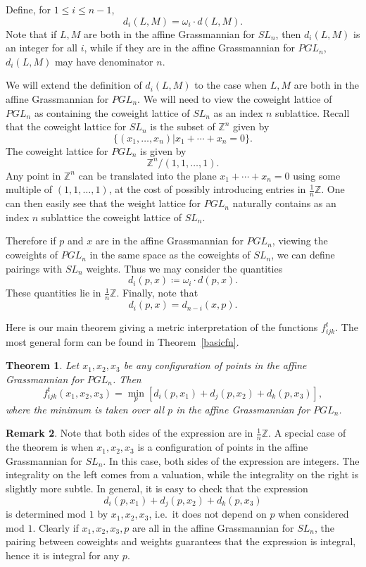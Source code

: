 \documentclass[10pt]{amsart}
\newtheorem{theorem}{Theorem}[section]
\theoremstyle{definition}
\newtheorem{rema}[theorem]{Remark}
\newcommand{\ie}{i.e.\ }
\newcommand{\Z}{\mathbb{Z}}
\begin{document}
Define, for $1 \leq i \leq n-1$,
\[
d_i(L,M) = \omega_i \cdot d(L,M).
\]
Note that if $L, M$ are both in the affine Grassmannian for $SL_n$, then $d_i(L,M)$ is an integer for all $i$, while if they are in the affine Grassmannian for $PGL_n$, $d_i(L,M)$ may have denominator $n$.

We will extend the definition of $d_i(L,M)$ to the case when $L, M$ are both in the affine Grassmannian for $PGL_n$. We will need to view the coweight lattice of $PGL_n$ as containing the coweight lattice of $SL_n$ as an index $n$ sublattice. Recall that the coweight lattice for $SL_n$ is the subset of $\Z^n$ given by 
\[
\{(x_1, \dots, x_n) | x_1 + \cdots + x_n=0\}.
\]
The coweight lattice for $PGL_n$ is given by
\[
\Z^n/(1, 1, \dots, 1).
\]
Any point in $\Z^n$ can be translated into the plane $x_1 + \cdots + x_n=0$ using some multiple of $(1, 1, \dots, 1)$, at the cost of possibly introducing entries in $\frac{1}{n} \Z.$ One can then easily see that the weight lattice for $PGL_n$ naturally contains as an index $n$ sublattice the coweight lattice of $SL_n$.

Therefore if $p$ and $x$ are in the affine Grassmannian for $PGL_n$, viewing the coweights of $PGL_n$ in the same space as the coweights of $SL_n$, we can define pairings with $SL_n$ weights. Thus we may consider the quantities 
\[
d_i(p,x) \coloneqq  \omega_i \cdot d(p,x).
\]
These quantities lie in $\frac{1}{n} \Z$. Finally, note that
\[
d_i(p,x) = d_{n-i}(x,p).
\]


Here is our main theorem giving a metric interpretation of the functions $f_{ijk}^t.$ The most general form can be found in Theorem~\ref{basicfn}.

\begin{theorem}\label{geometric} Let $x_1, x_2, x_3$ be any configuration of points in the affine Grassmannian for $PGL_n$. Then 
\begin{equation}\label{geoeqn}
f_{ijk}^t (x_1,x_2,x_3) = \min_{p} [d_i(p,x_1) + d_j(p,x_2) + d_k(p,x_3)],
\end{equation}
where the minimum is taken over all $p$ in the affine Grassmannian for $PGL_n$.
\end{theorem}

\begin{rema} Note that both sides of the expression are in $\frac{1}{n} \Z$. A special case of the theorem is when $x_1, x_2, x_3$ is a configuration of points in the affine Grassmannian for $SL_n$. In this case, both sides of the expression are integers. The integrality on the left comes from a valuation, while the integrality on the right is slightly more subtle. In general, it is easy to check that the expression 
\[
d_i(p,x_1) + d_j(p,x_2) + d_k(p,x_3)
\]
is determined mod $1$ by $x_1, x_2, x_3$, \ie it does not depend on $p$ when considered mod $1$. Clearly if $x_1, x_2, x_3, p$ are all in the affine Grassmannian for $SL_n$, the pairing between coweights and weights guarantees that the expression is integral, hence it is integral for any $p$.
\end{rema}
\end{document}
